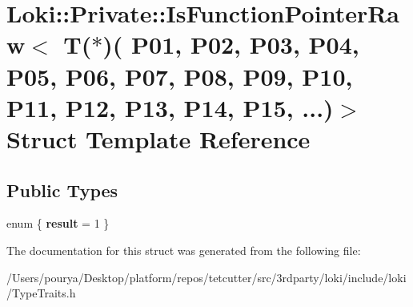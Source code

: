 \hypertarget{structLoki_1_1Private_1_1IsFunctionPointerRaw_3_01T_07_5_08_07_01_01_01_01_01_01_01_01_01_01_01_bf3b0a3f72c17acf84a8d83c8f7878c5}{}\section{Loki\+:\+:Private\+:\+:Is\+Function\+Pointer\+Raw$<$ T($\ast$)( P01, P02, P03, P04, P05, P06, P07, P08, P09, P10, P11, P12, P13, P14, P15, ...)$>$ Struct Template Reference}
\label{structLoki_1_1Private_1_1IsFunctionPointerRaw_3_01T_07_5_08_07_01_01_01_01_01_01_01_01_01_01_01_bf3b0a3f72c17acf84a8d83c8f7878c5}
\subsection*{Public Types}
\begin{DoxyCompactItemize}
\item 
\hypertarget{structLoki_1_1Private_1_1IsFunctionPointerRaw_3_01T_07_5_08_07_01_01_01_01_01_01_01_01_01_01_01_bf3b0a3f72c17acf84a8d83c8f7878c5_ab8c1553309b8efa6e4abc8f789d91cd8}{}enum \{ {\bfseries result} = 1
 \}\label{structLoki_1_1Private_1_1IsFunctionPointerRaw_3_01T_07_5_08_07_01_01_01_01_01_01_01_01_01_01_01_bf3b0a3f72c17acf84a8d83c8f7878c5_ab8c1553309b8efa6e4abc8f789d91cd8}

\end{DoxyCompactItemize}


The documentation for this struct was generated from the following file\+:\begin{DoxyCompactItemize}
\item 
/\+Users/pourya/\+Desktop/platform/repos/tetcutter/src/3rdparty/loki/include/loki/Type\+Traits.\+h\end{DoxyCompactItemize}

